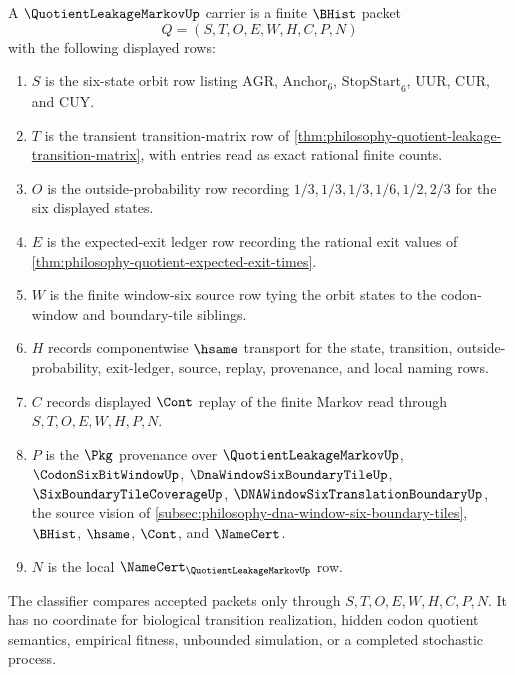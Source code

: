 \begin{definition}
\label{def:quotient-leakage-markov-carrier}
A $\QuotientLeakageMarkovUp$ carrier is a finite $\BHist$ packet
$$
Q=(S,T,O,E,W,H,C,P,N)
$$
with the following displayed rows:
\begin{enumerate}
\item $S$ is the six-state orbit row listing $\mathrm{AGR}$, $\mathrm{Anchor}_{6}$, $\mathrm{StopStart}_{6}$, $\mathrm{UUR}$, $\mathrm{CUR}$, and $\mathrm{CUY}$.
\item $T$ is the transient transition-matrix row of \autoref{thm:philosophy-quotient-leakage-transition-matrix}, with entries read as exact rational finite counts.
\item $O$ is the outside-probability row recording $1/3,1/3,1/3,1/6,1/2,2/3$ for the six displayed states.
\item $E$ is the expected-exit ledger row recording the rational exit values of \autoref{thm:philosophy-quotient-expected-exit-times}.
\item $W$ is the finite window-six source row tying the orbit states to the codon-window and boundary-tile siblings.
\item $H$ records componentwise $\hsame$ transport for the state, transition, outside-probability, exit-ledger, source, replay, provenance, and local naming rows.
\item $C$ records displayed $\Cont$ replay of the finite Markov read through $S,T,O,E,W,H,P,N$.
\item $P$ is the $\Pkg$ provenance over $\QuotientLeakageMarkovUp$, $\CodonSixBitWindowUp$, $\DnaWindowSixBoundaryTileUp$, $\SixBoundaryTileCoverageUp$, $\DNAWindowSixTranslationBoundaryUp$, the source vision of \autoref{subsec:philosophy-dna-window-six-boundary-tiles}, $\BHist$, $\hsame$, $\Cont$, and $\NameCert$.
\item $N$ is the local $\NameCert_{\QuotientLeakageMarkovUp}$ row.
\end{enumerate}
The classifier compares accepted packets only through $S,T,O,E,W,H,C,P,N$. It has no coordinate for biological transition realization, hidden codon quotient semantics, empirical fitness, unbounded simulation, or a completed stochastic process.
\end{definition}

